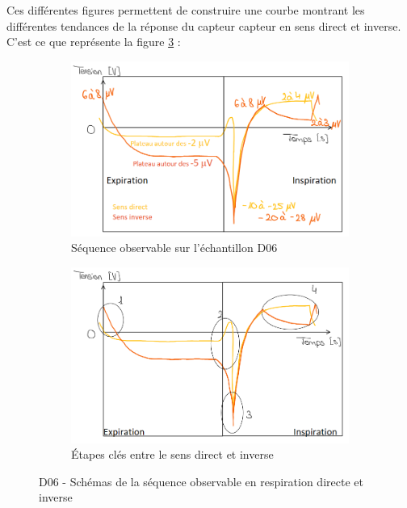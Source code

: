 Ces différentes figures permettent de construire une courbe montrant les différentes tendances de la réponse du capteur \gls{capteur} en sens direct et inverse. C'est ce que représente 
la figure \ref{fig:schemas_tendance} :\\
\begin{figure}[H]
    \hspace{-1.5cm}
    \begin{subfigure}{0.45\textwidth}
        \includegraphics[scale = 0.5]{assets/figures/D06_courbe_tendance.png}
        \caption{Séquence observable sur l'échantillon D06}
        \label{fig:courbe_tendance}
    \end{subfigure}
    \hspace{2cm}
    \begin{subfigure}{0.48\textwidth}
        \includegraphics[scale = 0.5]{assets/figures/D06_courbe_tendance_diff.png}
        \caption{Étapes clés entre le sens direct et inverse}
        \label{fig:tendance_2}
    \end{subfigure}
    \caption{D06 - Schémas de la séquence observable en respiration directe et inverse}
    \label{fig:schemas_tendance}
\end{figure}


